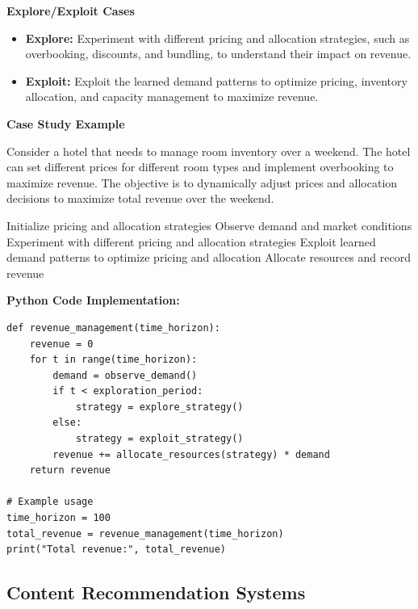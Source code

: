 \documentclass[12pt]{book} %
\begin{document}
\textbf{Explore/Exploit Cases}

\begin{itemize}
    \item \textbf{Explore:} Experiment with different pricing and allocation strategies, such as overbooking, discounts, and bundling, to understand their impact on revenue.
    \item \textbf{Exploit:} Exploit the learned demand patterns to optimize pricing, inventory allocation, and capacity management to maximize revenue.
\end{itemize}

\textbf{Case Study Example}

Consider a hotel that needs to manage room inventory over a weekend. The hotel can set different prices for different room types and implement overbooking to maximize revenue. The objective is to dynamically adjust prices and allocation decisions to maximize total revenue over the weekend.
\FloatBarrier
\begin{algorithm}
\caption{Explore-Exploit for Revenue Management}
\begin{algorithmic}[1]
\State Initialize pricing and allocation strategies
    \State Observe demand and market conditions
        \State Experiment with different pricing and allocation strategies
    \Else
        \State Exploit learned demand patterns to optimize pricing and allocation
    \EndIf
    \State Allocate resources and record revenue
\EndFor
\end{algorithmic}
\end{algorithm}
\FloatBarrier
\textbf{Python Code Implementation:}
\FloatBarrier
\begin{lstlisting}
def revenue_management(time_horizon):
    revenue = 0
    for t in range(time_horizon):
        demand = observe_demand()
        if t < exploration_period:
            strategy = explore_strategy()
        else:
            strategy = exploit_strategy()
        revenue += allocate_resources(strategy) * demand
    return revenue

# Example usage
time_horizon = 100
total_revenue = revenue_management(time_horizon)
print("Total revenue:", total_revenue)
\end{lstlisting}
\FloatBarrier

\subsection{Content Recommendation Systems}
\end{document}
